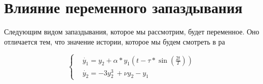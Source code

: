\chapter{Влияние переменного запаздывания}

Следующим видом запаздывания, которое мы рассмотрим, будет
переменное. Оно отличается тем, что значение истории,
которое мы будем смотреть в ра

\begin{equation}\label{lab6:eq3}
  \begin{cases}
      &\dot{y_1} = y_2 + \alpha * y_1(t-\tau*\sin(\frac{2t}{T}))\\
      &\dot{y_2} = -3y_2^3\ + \nu y_2 - y_1
  \end{cases}
\end{equation}

